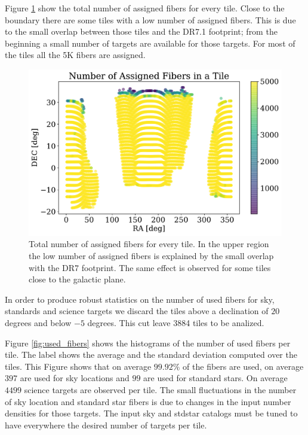 \documentclass{article}
\begin{document}
Figure \ref{fig:assigned_ra_dec} show the total number of assigned
fibers for every tile. 
Close to the boundary there are some tiles with a low number of
assigned fibers. 
This is due to the small overlap between those tiles and the DR7.1
footprint; from the beginning a small number of targets are available
for those targets. 
For most of the tiles all the 5K fibers are assigned.

\begin{figure}[!h]
\begin{center}
\includegraphics[scale=0.50]{assigned_ra_dec.pdf}
\caption{Total number of assigned fibers for every tile. In the upper
  region the low number of assigned fibers is explained by the small
  overlap with the DR7 footprint.  The same effect is observed for
  some tiles close to the galactic plane.
\label{fig:assigned_ra_dec}}
\end{center}
\end{figure}

In order to produce robust statistics on the number of used fibers for
sky, standards and science targets we discard the tiles above a
declination of $20$ degrees and below $-5$ degrees. 
This cut leave 3884 tiles to be analized.

Figure \ref{fig:used_fibers} shows the histograms of the number of
used fibers per tile.
The label shows the average and the standard deviation computed over
the tiles. 
This Figure shows that on average $99.92\%$ of the fibers are used,
on average $397$ are used for sky locations and $99$ are used for
standard stars. 
On average $4499$ science targets are observed per tile.
The small fluctuations in the number of sky location and standard star fibers
is due to changes in the input number densities for those targets. 
The input sky and stdstar catalogs must be tuned to have everywhere
the desired number of targets per tile. 
\end{document}
